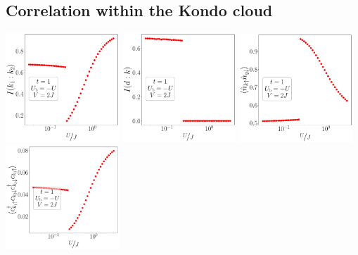\documentclass{report}
\numberwithin{equation}{section}
\begin{document}
\subsection*{Correlation within the Kondo cloud}
\begin{center}
	\includegraphics[width=0.32\textwidth]{../figures/corr-k-t=1.000,J=31.623,0.000,50,V=2J,Ubath=-U,N=4,U=0.032,3.162,50.pdf}
	\includegraphics[width=0.32\textwidth]{../figures/mi-dk-t=1.000,J=31.623,0.000,50,V=2J,Ubath=-U,N=4,U=0.032,3.162,50.pdf}
	\includegraphics[width=0.32\textwidth]{../figures/corr-k-diag-t=1.000,J=31.623,0.000,50,V=2J,Ubath=-U,N=4,U=0.032,3.162,50.pdf}
	\includegraphics[width=0.32\textwidth]{../figures/corr-k-od-t=1.000,J=31.623,0.000,50,V=2J,Ubath=-U,N=4,U=0.032,3.162,50.pdf}
\end{center}
\end{document}
